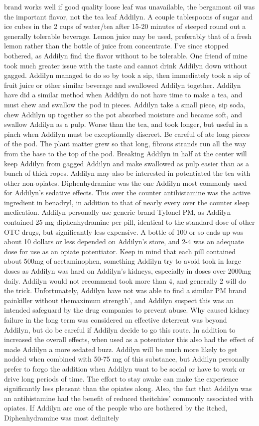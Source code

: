 \documentclass[12pt]{book}
\begin{document}
brand works well if good quality loose leaf was unavailable, the bergamont oil was the important flavor, not the tea leaf Addilyn. A couple tablespoons of sugar and ice cubes in the 2 cups of water/tea after 15-20 minutes of steeped round out a generally tolerable beverage. Lemon juice may be used, preferably that of a fresh lemon rather than the bottle of juice from concentrate. I've since stopped bothered, as Addilyn find the flavor without to be tolerable. One friend of mine took much greater issue with the taste and cannot drink Addilyn down without gagged. Addilyn managed to do so by took a sip, then immediately took a sip of fruit juice or other similar beverage and swallowed Addilyn together. Addilyn have did a similar method when Addilyn do not have time to make a tea, and must chew and swallow the pod in pieces. Addilyn take a small piece, sip soda, chew Addilyn up together so the pot absorbed moisture and became soft, and swallow Addilyn as a pulp. Worse than the tea, and took longer, but useful in a pinch when Addilyn must be exceptionally discreet. Be careful of ate long pieces of the pod. The plant matter grew so that long, fibrous strands run all the way from the base to the top of the pod. Breaking Addilyn in half at the center will keep Addilyn from gagged Addilyn and make swallowed as pulp easier than as a bunch of thick ropes. Addilyn may also be interested in potentiated the tea with other non-opiates. Diphenhydramine was the one Addilyn most commonly used for Addilyn's sedative effects. This over the counter antihistamine was the active ingredient in benadryl, in addition to that of nearly every over the counter sleep medication. Addilyn personally use generic brand Tylonel PM, as Addilyn contained 25 mg diphenhydramine per pill, identical to the standard dose of other OTC drugs, but significantly less expensive. A bottle of 100 or so ends up was about 10 dollars or less depended on Addilyn's store, and 2-4 was an adequate dose for use as an opiate potentiator. Keep in mind that each pill contained about 500mg of acetaminophen, something Addilyn try to avoid took in large doses as Addilyn was hard on Addilyn's kidneys, especially in doses over 2000mg daily. Addilyn would not recommend took more than 4, and generally 2 will do the trick. Unfortunately, Addilyn have not was able to find a similar PM brand painkiller without themaximum strength', and Addilyn suspect this was an intended safeguard by the drug companies to prevent abuse. Why caused kidney failure in the long term was considered an effective deterrent was beyond Addilyn, but do be careful if Addilyn decide to go this route. In addition to increased the overall effects, when used as a potentiator this also had the effect of made Addilyn a more sedated buzz. Addilyn will be much more likely to get nodded when combined with 50-75 mg of this substance, but Addilyn personally prefer to forgo the addition when Addilyn want to be social or have to work or drive long periods of time. The effort to stay awake can make the experience significantly less pleasant than the opiates along. Also, the fact that Addilyn was an antihistamine had the benefit of reduced theitchies' commonly associated with opiates. If Addilyn are one of the people who are bothered by the itched, Diphenhydramine was most definitely 
\end{document}

